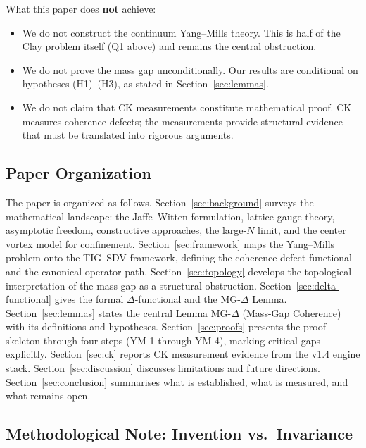 \documentclass[11pt]{article}
\begin{document}
\noindent
What this paper does \textbf{not} achieve:
\begin{itemize}
  \item We do not construct the continuum Yang--Mills theory.  This is
    half of the Clay problem itself (Q1 above) and remains the central
    obstruction.
  \item We do not prove the mass gap unconditionally.  Our results are
    conditional on hypotheses (H1)--(H3), as stated in
    Section~\ref{sec:lemmas}.
  \item We do not claim that CK measurements constitute mathematical
    proof.  CK measures coherence defects; the measurements provide
    structural evidence that must be translated into rigorous arguments.
\end{itemize}

\subsection*{Paper Organization}

The paper is organized as follows.  Section~\ref{sec:background}
surveys the mathematical landscape: the Jaffe--Witten formulation,
lattice gauge theory, asymptotic freedom, constructive approaches,
the large-$N$ limit, and the center vortex model for confinement.
Section~\ref{sec:framework} maps the Yang--Mills problem onto the
TIG--SDV framework, defining the coherence defect functional and
the canonical operator path.
Section~\ref{sec:topology} develops the topological interpretation
of the mass gap as a structural obstruction.
Section~\ref{sec:delta-functional} gives the formal
$\Delta$-functional and the MG-$\Delta$ Lemma.
Section~\ref{sec:lemmas} states the central Lemma MG-$\Delta$
(Mass-Gap Coherence) with its definitions and hypotheses.
Section~\ref{sec:proofs} presents the proof skeleton through
four steps (YM-1 through YM-4), marking critical gaps explicitly.
Section~\ref{sec:ck} reports CK measurement evidence from the v1.4
engine stack.
Section~\ref{sec:discussion} discusses limitations and future
directions.
Section~\ref{sec:conclusion} summarises what is established, what is
measured, and what remains open.

\subsection*{Methodological Note: Invention vs.\ Invariance}
\end{document}

